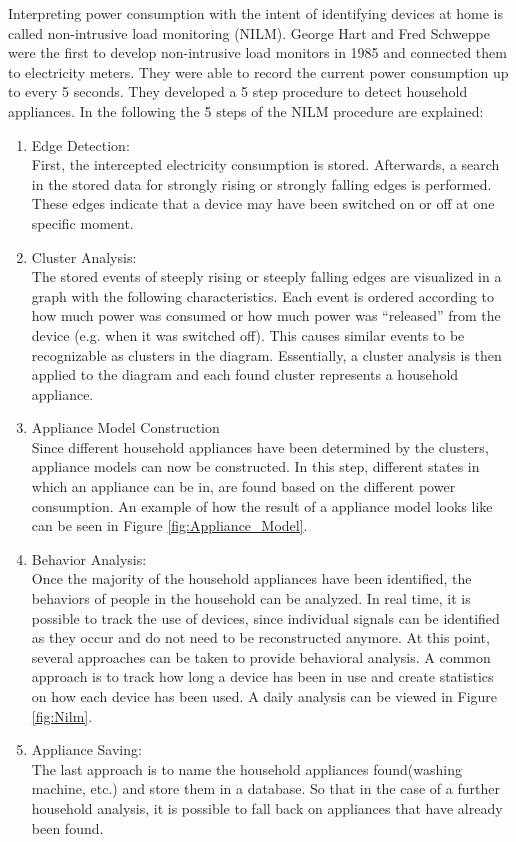 Interpreting power consumption with the intent of identifying devices at home is called non-intrusive load monitoring (NILM). George Hart and Fred Schweppe were the first to develop non-intrusive load monitors in 1985 and connected them to electricity meters. They were able to record the current power consumption up to every 5 seconds. They developed a 5 step procedure to detect household appliances.
In the following the 5 steps of the NILM procedure are explained:
\begin{enumerate}
\item Edge Detection:\\
First, the intercepted electricity consumption is stored. Afterwards, a search in the stored data for strongly rising or strongly falling edges is performed. These edges indicate that a device may have been switched on or off at one specific moment.
\item Cluster Analysis:\\ 
The stored events of steeply rising or steeply falling edges are visualized in a graph with the following characteristics. Each event is ordered according to how much power was consumed or how much power was 	``released'' from the device (e.g. when it was switched off). This causes similar events to be recognizable as clusters in the diagram.
Essentially, a cluster analysis is then applied to the diagram and each found cluster represents a household appliance.
\item Appliance Model Construction\\
Since different household appliances have been determined by the clusters, appliance models can now be constructed. In this step, different states in which an appliance can be in, are found based on the different power consumption. An example of how the result of a appliance model looks like can be seen in Figure \ref{fig:Appliance_Model}.
\item Behavior Analysis:\\
Once the majority of the household appliances have been identified, the behaviors of people in the household can be analyzed. In real time, it is possible to track the use of devices, since individual signals can be identified as they occur and do not need to be reconstructed anymore.
At this point, several approaches can be taken to provide behavioral analysis. A common approach is to track how long a device has been in use and create statistics on how each device has been used. A daily analysis can be viewed in Figure \ref{fig:Nilm}.
\item Appliance Saving:\\
The last approach is to name the household appliances found(washing machine, etc.) and store them in a database. So that in the case of a further household analysis, it is possible to fall back on appliances that have already been found.
\end{enumerate}
